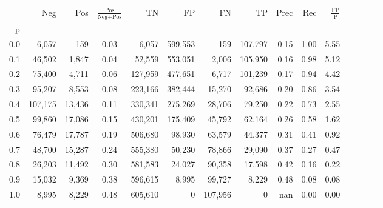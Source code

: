 \begin{tabular}{rrrcrrrrrrrrrrr}
\toprule
{} &      Neg &     Pos & $\frac{\text{Pos}}{\text{Neg}+\text{Pos}}$ &       TN &       FP &       FN &       TP &  Prec &   Rec & $\frac{\text{FP}}{\text{P}}$ \\
p   &          &         &                                            &          &          &          &          &       &       &                              \\
\midrule
0.0 &    6,057 &     159 &                                       0.03 &    6,057 &  599,553 &      159 &  107,797 &  0.15 &  1.00 &                         5.55 \\
0.1 &   46,502 &   1,847 &                                       0.04 &   52,559 &  553,051 &    2,006 &  105,950 &  0.16 &  0.98 &                         5.12 \\
0.2 &   75,400 &   4,711 &                                       0.06 &  127,959 &  477,651 &    6,717 &  101,239 &  0.17 &  0.94 &                         4.42 \\
0.3 &   95,207 &   8,553 &                                       0.08 &  223,166 &  382,444 &   15,270 &   92,686 &  0.20 &  0.86 &                         3.54 \\
0.4 &  107,175 &  13,436 &                                       0.11 &  330,341 &  275,269 &   28,706 &   79,250 &  0.22 &  0.73 &                         2.55 \\
0.5 &   99,860 &  17,086 &                                       0.15 &  430,201 &  175,409 &   45,792 &   62,164 &  0.26 &  0.58 &                         1.62 \\
0.6 &   76,479 &  17,787 &                                       0.19 &  506,680 &   98,930 &   63,579 &   44,377 &  0.31 &  0.41 &                         0.92 \\
0.7 &   48,700 &  15,287 &                                       0.24 &  555,380 &   50,230 &   78,866 &   29,090 &  0.37 &  0.27 &                         0.47 \\
0.8 &   26,203 &  11,492 &                                       0.30 &  581,583 &   24,027 &   90,358 &   17,598 &  0.42 &  0.16 &                         0.22 \\
0.9 &   15,032 &   9,369 &                                       0.38 &  596,615 &    8,995 &   99,727 &    8,229 &  0.48 &  0.08 &                         0.08 \\
1.0 &    8,995 &   8,229 &                                       0.48 &  605,610 &        0 &  107,956 &        0 &   nan &  0.00 &                         0.00 \\
\bottomrule
\end{tabular}
